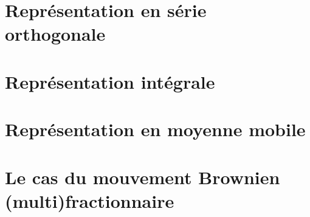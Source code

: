 
\section{Représentation en série orthogonale}
\section{Représentation intégrale}
\section{Représentation en moyenne mobile}
\section{Le cas du mouvement Brownien (multi)fractionnaire}

